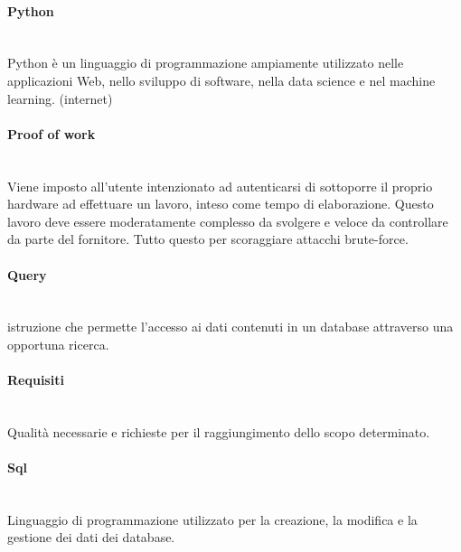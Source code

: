 \paragraph{Python}~\smallskip \\
Python è un linguaggio di programmazione ampiamente utilizzato nelle applicazioni Web, nello sviluppo di software, nella data science e nel machine learning. (internet)

\paragraph{Proof of work}~\smallskip \\
Viene imposto all'utente intenzionato ad autenticarsi di sottoporre il proprio hardware ad effettuare un lavoro, inteso come tempo di elaborazione. Questo lavoro deve essere moderatamente complesso da svolgere e veloce da controllare da parte del fornitore. Tutto questo per scoraggiare attacchi brute-force.

\paragraph{Query}~\smallskip \\
istruzione che permette l'accesso ai dati contenuti in un database attraverso una opportuna ricerca.

\paragraph{Requisiti}~\smallskip \\
Qualità necessarie e richieste per il raggiungimento dello scopo determinato.

\paragraph{Sql}~\smallskip \\
Linguaggio di programmazione utilizzato per la creazione, la modifica e la gestione dei dati dei database.
